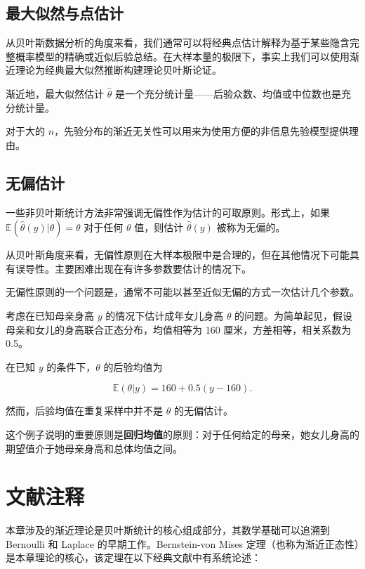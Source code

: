 \subsection{最大似然与点估计}

从贝叶斯数据分析的角度来看，我们通常可以将经典点估计解释为基于某些隐含完整概率模型的精确或近似后验总结。在大样本量的极限下，事实上我们可以使用渐近理论为经典最大似然推断构建理论贝叶斯论证。

渐近地，最大似然估计 $\hat{\theta}$ 是一个充分统计量——后验众数、均值或中位数也是充分统计量。

对于大的 $n$，先验分布的渐近无关性可以用来为使用方便的非信息先验模型提供理由。

\subsection{无偏估计}

一些非贝叶斯统计方法非常强调无偏性作为估计的可取原则。形式上，如果 $\mathbb{E}(\hat{\theta}(y)|\theta) = \theta$ 对于任何 $\theta$ 值，则估计 $\hat{\theta}(y)$ 被称为无偏的。

从贝叶斯角度来看，无偏性原则在大样本极限中是合理的，但在其他情况下可能具有误导性。主要困难出现在有许多参数要估计的情况下。

\begin{Remark}
  无偏性原则的一个问题是，通常不可能以甚至近似无偏的方式一次估计几个参数。
\end{Remark}

\begin{Example}[使用回归进行预测]
  考虑在已知母亲身高 $y$ 的情况下估计成年女儿身高 $\theta$ 的问题。为简单起见，假设母亲和女儿的身高联合正态分布，均值相等为 160 厘米，方差相等，相关系数为 0.5。

  在已知 $y$ 的条件下，$\theta$ 的后验均值为

  \[
  \mathbb{E}(\theta | y) = 160 + 0.5(y - 160). \label{eq:regression-mean-posterior}
  \]

  然而，后验均值在重复采样中并不是 $\theta$ 的无偏估计。

  这个例子说明的重要原则是\textbf{回归均值}的原则：对于任何给定的母亲，她女儿身高的期望值介于她母亲身高和总体均值之间。
\end{Example}

\section{文献注释}\label{sec:ch4-bib}

本章涉及的渐近理论是贝叶斯统计的核心组成部分，其数学基础可以追溯到 Bernoulli 和 Laplace 的早期工作。Bernstein-von Mises 定理（也称为渐近正态性）是本章理论的核心，该定理在以下经典文献中有系统论述：

